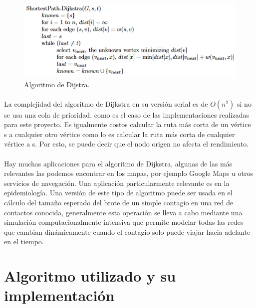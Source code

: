 \documentclass[11pt]{article}
\begin{document}
\begin{figure}
\includegraphics[width=0.9\linewidth]{algoritmo.png}
  \caption{Algoritmo de Dijstra.}
\end{figure}

\paragraph{}
La complejidad del algoritmo de Dijkstra en su versión serial es de $O(n^2)$ si no se usa una cola de prioridad, como es el caso de las implementaciones realizadas para este proyecto. Es igualmente costos calcular la ruta más corta de un vértice s a cualquier otro vértice como lo es calcular la ruta más corta de cualquier vértice a s. Por esto, se puede decir que el nodo origen no afecta el rendimiento. 

\paragraph{}
Hay muchas aplicaciones para el algoritmo de Dijkstra, algunas de las más relevantes las podemos encontrar en los mapas, por ejemplo Google Maps u otros servicios de navegación. Una aplicación particularmente relevante es en la epidemiología. Una versión de este tipo de algoritmo puede ser usada en el cálculo del tamaño esperado del brote de un simple contagio en una red de contactos conocida, generalmente esta operación se lleva a cabo mediante una simulación computacionalmente intensiva que permite modelar todas las redes que cambian dinámicamente cuando el contagio solo puede viajar hacia adelante en el tiempo.



\section{Algoritmo utilizado y su implementación }
\end{document}
